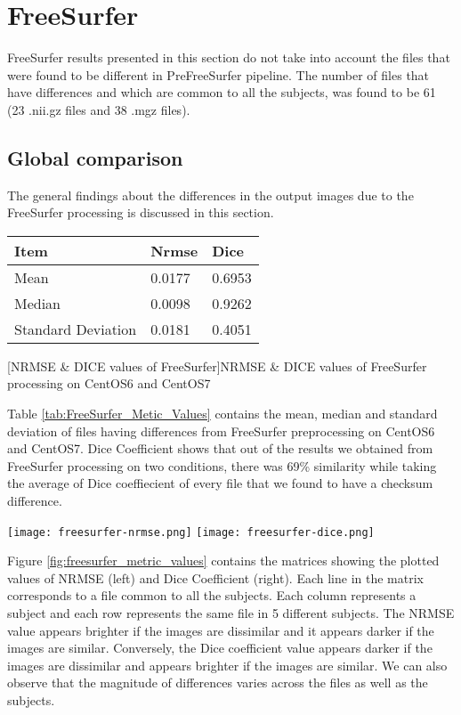 \section{FreeSurfer} \label{sec:Freesurfer}
FreeSurfer results presented in this section do not take into account the files that were found to be different in PreFreeSurfer pipeline. The number of files that have differences and which are common to all the subjects, was found to be 61 (23 .nii.gz files and 38 .mgz files).

\subsection{Global comparison}
The general findings about the differences in the output images due to the FreeSurfer processing is discussed in this section.

\begin{center}
\begin{tabular}{|l|l|l|}
\hline
\textbf{Item}      & \textbf{Nrmse} & \textbf{Dice} \\ \hline
Mean               & 0.0177    & 0.6953  \\ \hline
Median             & 0.0098    & 0.9262   \\ \hline
Standard Deviation & 0.0181     & 0.4051   \\ \hline
\end{tabular}
[NRMSE \& DICE values of FreeSurfer]{NRMSE \& DICE values of FreeSurfer processing on CentOS6 and CentOS7}
\label{tab:FreeSurfer_Metic_Values}
\end{center}

Table \ref{tab:FreeSurfer_Metic_Values} contains the mean, median and standard deviation of files having differences from FreeSurfer preprocessing on CentOS6 and CentOS7. Dice Coefficient shows that out of the results we obtained from FreeSurfer processing on two conditions, there was 69\% similarity while taking the average of Dice coeffiecient of every file that we found to have a checksum difference.
\begin{center}
\texttt{[image: freesurfer-nrmse.png]}%
\texttt{[image: freesurfer-dice.png]}
\caption*{(i) NRMSE (left) (ii)Dice Coefficient (right)}
\label{fig:freesurfer_metric_values}
\end{center}

Figure \ref{fig:freesurfer_metric_values} contains the matrices showing the plotted values of NRMSE (left) and Dice Coefficient (right). Each line in the matrix corresponds to a file common to all the subjects. Each column represents a subject and each row represents the same file in 5 different subjects. The NRMSE value appears brighter if the images are dissimilar and it appears darker if the images are similar. Conversely, the Dice coefficient value appears darker if the images are dissimilar and appears brighter if the images are similar. We can also observe that the magnitude of differences varies across the files as well as the subjects.

